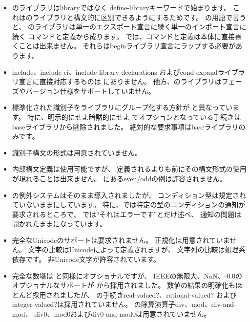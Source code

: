 \begin{itemize}
\item \rsevenrs のライブラリは{\cf library}ではなく
{\cf define-library}キーワードで始まります。
これは\rsixrs のライブラリと構文的に区別できるようにするためです。
\rsevenrs の用語で言うと、
\rsixrs のライブラリは単一のエクスポート宣言に続く単一のインポート宣言に続く
コマンドと定義から成ります。
\rsevenrs では、コマンドと定義は本体に直接書くことは出来ません。
それらは{\cf begin}ライブラリ宣言にラップする必要があります。

\item {\cf include}、{\cf include-ci}、{\cf include-library-declarations}
および{\cf cond-expand}ライブラリ宣言に直接対応するものは \rsixrs にありません。
他方、\rsevenrs のライブラリはフェーズやバージョン仕様をサポートしていません。

\item 標準化された識別子をライブラリにグループ化する方針が \rsixrs と異なっています。
特に、明示的にせよ暗黙的にせよ \rfivers でオプションとなっている手続きは
baseライブラリから削除されました。
絶対的な要求事項はbaseライブラリのみです。

\item 識別子構文の形式は用意されていません。

\item 内部構文定義は使用可能ですが、
定義されるよりも前にその構文形式の使用が現れることは出来ません。
\rsixrs にある{\cf even}/{\cf odd}の例は許容されません。

\item \rsixrs の例外システムはそのまま導入されましたが、
コンディション型は規定されていないままにしています。
特に、\rsixrs では特定の型のコンディションの通知が要求されるところで、
\rsevenrs では``それはエラーです''とだけ述べ、
通知の問題は開かれたままになっています。

\item 完全なUnicodeのサポートは要求されません。
正規化は用意されていません。
文字の比較はUnicodeによって定義されますが、
文字列の比較は処理系依存です。
非Unicode文字が許容されています。

\item 完全な数塔は \rfivers と同様にオプショナルですが、
IEEEの無限大、NaN、{\mbox -0.0}のオプショナルなサポートが \rsixrs から採用されました。
数値の結果の明確化もほとんど採用されましたが、
\rsixrs の手続き{\cf real-valued?}、{\cf rational-valued?}
および{\cf integer-valued?}は採用されていません。
\rsixrs の除算演算子{\cf div}、{\cf mod}、{\cf div-and-mod}、
{\cf div0}、{\cf mod0}および{\cf div0-and-mod0}は用意されていません。


\end{itemize}

